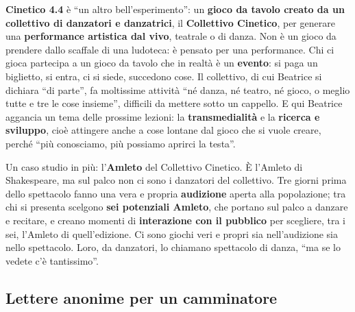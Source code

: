 \textbf{Cinetico 4.4} è ``un altro bell'esperimento'': un \textbf{gioco da
tavolo creato da un collettivo di danzatori e danzatrici}, il \textbf{Collettivo
Cinetico}, per generare una \textbf{performance artistica dal vivo}, teatrale o
di danza. Non è un gioco da prendere dallo scaffale di una ludoteca: è pensato
per una performance. Chi ci gioca partecipa a un gioco da tavolo che in realtà è
un \textbf{evento}: si paga un biglietto, si entra, ci si siede, succedono cose.
Il collettivo, di cui Beatrice si dichiara ``di parte'', fa moltissime attività
``né danza, né teatro, né gioco, o meglio tutte e tre le cose insieme'', difficili
da mettere sotto un cappello. E qui Beatrice aggancia un tema delle prossime
lezioni: la \textbf{transmedialità} e la \textbf{ricerca e sviluppo}, cioè
attingere anche a cose lontane dal gioco che si vuole creare, perché ``più
conosciamo, più possiamo aprirci la testa''.

Un caso studio in più: l'\textbf{Amleto} del Collettivo Cinetico. È l'Amleto di
Shakespeare, ma sul palco non ci sono i danzatori del collettivo. Tre giorni
prima dello spettacolo fanno una vera e propria \textbf{audizione} aperta alla
popolazione; tra chi si presenta scelgono \textbf{sei potenziali Amleto}, che
portano sul palco a danzare e recitare, e creano momenti di
\textbf{interazione con il pubblico} per scegliere, tra i sei, l'Amleto di
quell'edizione. Ci sono giochi veri e propri sia nell'audizione sia nello
spettacolo. Loro, da danzatori, lo chiamano spettacolo di danza, ``ma se lo
vedete c'è tantissimo''.

\subsection{Lettere anonime per un camminatore}

